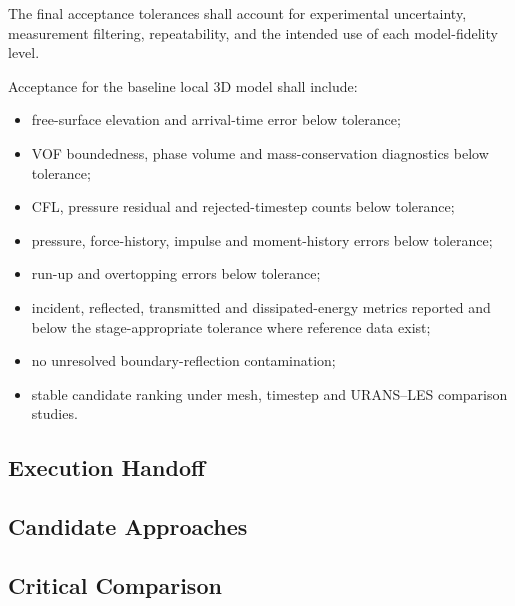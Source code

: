 The final acceptance tolerances shall account for experimental
uncertainty, measurement filtering, repeatability, and the intended use
of each model-fidelity level.

Acceptance for the baseline local 3D model shall include:

\begin{itemize}
  \item free-surface elevation and arrival-time error below tolerance;
  \item VOF boundedness, phase volume and mass-conservation
    diagnostics below tolerance;
  \item CFL, pressure residual and rejected-timestep counts below
    tolerance;
  \item pressure, force-history, impulse and moment-history errors
    below tolerance;
  \item run-up and overtopping errors below tolerance;
  \item incident, reflected, transmitted and dissipated-energy metrics
    reported and below the stage-appropriate tolerance where reference
    data exist;
  \item no unresolved boundary-reflection contamination;
  \item stable candidate ranking under mesh, timestep and URANS--LES
    comparison studies.
\end{itemize}

\subsection{Execution Handoff}
\label{sec:res-ver-met-execution-handoff}


\subsection{Candidate Approaches}
\label{sec:res-ver-met-candidate-approaches}


\subsection{Critical Comparison}
\label{sec:res-ver-met-critical-comparison}


